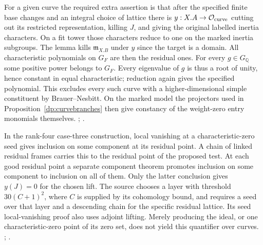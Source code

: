 For a given curve the required extra assertion is that after
the specified finite base changes and an integral choice of
lattice there is \(y:X.A\to\mathcal O_{\rm curve}\) cutting out
its restricted representation, killing \(J\), and giving the
original labelled inertia characters. On a fit tower those
characters reduce to one on the marked inertia subgroups. The
lemma kills \(\mathfrak m_{X.B}\) under \(y\) since the target is
a domain. All characteristic polynomials on \(G_F\) are then the
residual ones. For every \(g\in G_{\mathbb Q}\) some positive
power belongs to \(G_F\). Every eigenvalue of \(g\) is thus a
root of unity, hence constant in equal characteristic; reduction
again gives the specified polynomial. This excludes every such
curve with a higher-dimensional simple constituent by
Brauer--Nesbitt. On the marked model the projectors used in
Proposition~\ref{dp:curvebranches} then give constancy of the
weight-zero entry monomials themselves.
;
.

In the rank-four case-three construction, local vanishing at a
characteristic-zero seed gives inclusion on some component at its
residual point. A chain of linked residual frames carries this
to the residual point of the proposed test. At each good residual
point a separate component theorem promotes inclusion on some
component to inclusion on all of them. Only the latter conclusion
gives \(y(J)=0\) for the chosen lift. The source chooses a layer
with threshold \(30(C+1)^2\), where \(C\) is supplied by its
cohomology bound, and requires a seed over that layer and a
descending chain for the specific residual lattice. Its seed
local-vanishing proof also uses adjoint lifting. Merely producing
the ideal, or one characteristic-zero point of its zero set,
does not yield this quantifier over curves.
;
.

